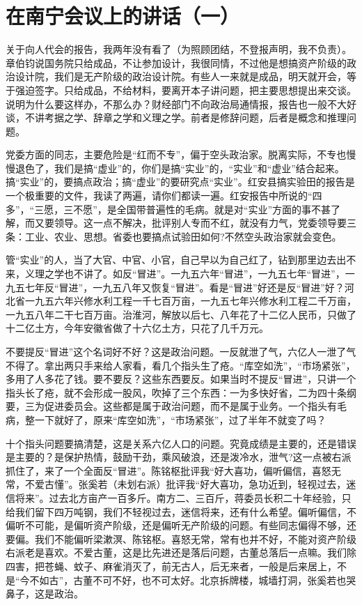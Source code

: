 \section[在南宁会议上的讲话（一）（一九五八年一月十一日）]{在南宁会议上的讲话（一）}


关于向人代会的报告，我两年没有看了（为照顾团结，不登报声明，我不负责）。章伯钧说国务院只给成品，不让参加设计，我很同情，不过他是想搞资产阶级的政治设计院，我们是无产阶级的政治设计院。有些人一来就是成品，明天就开会，等于强迫签字。只给成品，不给材料，要离开本子讲问题，把主要思想提出来交谈。说明为什么要这样办，不那么办？财经部门不向政治局通情报，报告也一般不大好谈，不讲考据之学、辞章之学和义理之学。前者是修辞问题，后者是概念和推理问题。

党委方面的同志，主要危险是“红而不专”，偏于空头政治家。脱离实际，不专也慢慢退色了，我们是搞“虚业”的，你们是搞“实业”的，“实业”和“虚业”结合起来。搞“实业”的，要搞点政治；搞“虚业”的要研究点“实业”。红安县搞实验田的报告是一个极重要的文件，我读了两遍，请你们都读一遍。红安报告中所说的“四多”，“三愿，三不愿”，是全国带普遍性的毛病。就是对“实业”方面的事不甚了解，而又要领导。这一点不解决，批评别人专而不红，就没有力气，党委领导要三条：工业、农业、思想。省委也要搞点试验田如何?不然空头政治家就会变色。

管“实业”的人，当了大官、中官、小官，自己早以为自己红了，钻到那里边去出不来，义理之学也不讲了。如反“冒进”。一九五六年“冒进”，一九五七年“冒进”，一九五七年反“冒进”，一九五八年又恢复“冒进”。看是“冒进”好还是反“冒进”好？河北省一九五六年兴修水利工程一千七百万亩，一九五七年兴修水利工程二千万亩，一九五八年二干七百万亩。治淮河，解放以后七、八年花了十二亿人民币，只做了十二亿土方，今年安徽省做了十六亿土方，只花了几千万元。

不要提反“冒进”这个名词好不好？这是政治问题。一反就泄了气，六亿人一泄了气不得了。拿出两只手来给人家看，看几个指头生了疮。“库空如洗”，“市场紧张”，多用了人多花了钱。要不要反？这些东西要反。如果当时不提反“冒进”，只讲一个指头长了疮，就不会形成一股风，吹掉了三个东西：一为多快好省，二为四十条纲要，三为促进委员会。这些都是属于政治问题，而不是属于业务。一个指头有毛病，整一下就好了，原来“库空如洗”，“市场紧张”，过了半年不就变了吗？

十个指头问题要搞清楚，这是关系六亿人口的问题。究竟成绩是主要的，还是错误是主要的？是保护热情，鼓励干劲，乘风破浪，还是泼冷水，泄气?这一点被右派抓住了，来了一个全面反“冒进”。陈铭枢批评我“好大喜功，偏听偏信，喜怒无常，不爱古懂”。张奚若（未划右派）批评我“好大喜功，急功近到，轻视过去，迷信将来”。过去北方亩产一百多斤。南方二、三百斤，蒋委员长积二十年经验，只给我们留下四万吨钢，我们不轻视过去，迷信将来，还有什么希望。偏听偏信，不偏听不可能，是偏听资产阶级，还是偏听无产阶级的问题。有些同志偏得不够，还要偏。我们不能偏听梁漱溟、陈铭枢。喜怒无常，常有也并不好，不能对资产阶级右派老是喜欢。不爱古董，这是比先进还是落后问题，古董总落后一点嘛。我们除四害，把苍蝇、蚊子、麻雀消灭了，前无古人，后无来者，一般是后来居上，不是“今不如古”，古董不可不好，也不可太好。北京拆牌楼，城墙打洞，张奚若也哭鼻子，这是政治。

